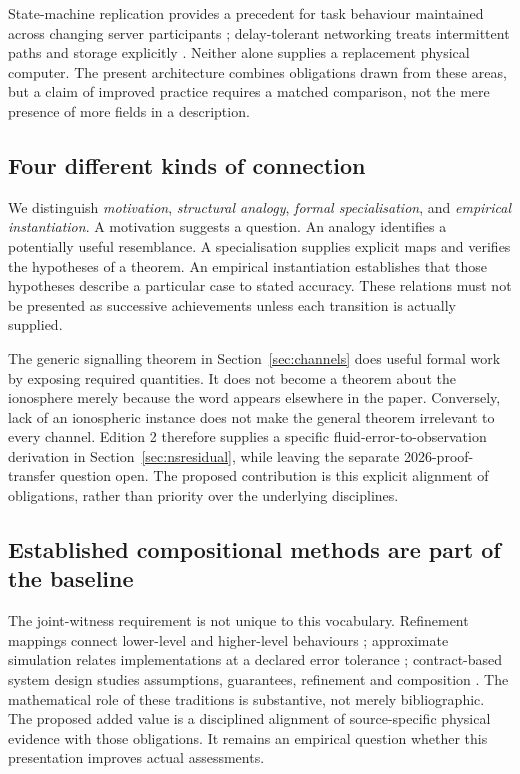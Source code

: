 State-machine replication provides a precedent for task behaviour maintained across changing server participants \citep{schneider}; delay-tolerant networking treats intermittent paths and storage explicitly \citep{dtn}. Neither alone supplies a replacement physical computer. The present architecture combines obligations drawn from these areas, but a claim of improved practice requires a matched comparison, not the mere presence of more fields in a description.

\subsection{Four different kinds of connection}
We distinguish \emph{motivation}, \emph{structural analogy}, \emph{formal specialisation}, and \emph{empirical instantiation}. A motivation suggests a question. An analogy identifies a potentially useful resemblance. A specialisation supplies explicit maps and verifies the hypotheses of a theorem. An empirical instantiation establishes that those hypotheses describe a particular case to stated accuracy. These relations must not be presented as successive achievements unless each transition is actually supplied.

The generic signalling theorem in Section~\ref{sec:channels} does useful formal work by exposing required quantities. It does not become a theorem about the ionosphere merely because the word appears elsewhere in the paper. Conversely, lack of an ionospheric instance does not make the general theorem irrelevant to every channel. Edition 2 therefore supplies a specific fluid-error-to-observation derivation in Section~\ref{sec:nsresidual}, while leaving the separate 2026-proof-transfer question open. The proposed contribution is this explicit alignment of obligations, rather than priority over the underlying disciplines.

\subsection{Established compositional methods are part of the baseline}
The joint-witness requirement is not unique to this vocabulary. Refinement mappings connect lower-level and higher-level behaviours \citep{abadi}; approximate simulation relates implementations at a declared error tolerance \citep{girard}; contract-based system design studies assumptions, guarantees, refinement and composition \citep{contracts}. The mathematical role of these traditions is substantive, not merely bibliographic. The proposed added value is a disciplined alignment of source-specific physical evidence with those obligations. It remains an empirical question whether this presentation improves actual assessments.
